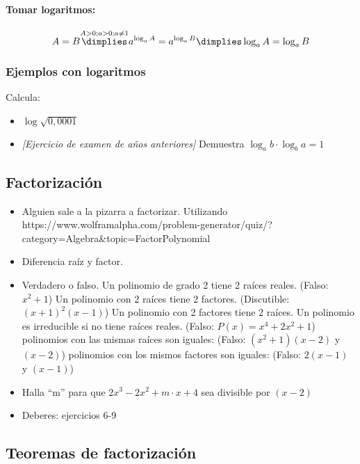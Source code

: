 \paragraph{Tomar logaritmos:}

\[
A = B \overset{A>0; a>0; a\neq 1}{\dimplies} a^{\log_a A} = a^{\log_a B} \dimplies \log_aA=\log_aB
\]


\subsubsection{Ejemplos con logaritmos}

Calcula:
\begin{itemize}
	\item $\log \sqrt{0,0001}$
	\item \textit{[Ejercicio de examen de años anteriores]} Demuestra $\log_a b · \log_b a = 1$ 
\end{itemize}


\subsection{Factorización}

\begin{itemize}
	\item Alguien sale a la pizarra a factorizar. Utilizando 
https://www.wolframalpha.com/problem-generator/quiz/?category=Algebra\&topic=FactorPolynomial 
	\item Diferencia raíz y factor.
	\item Verdadero o falso.
	\subitem Un polinomio de grado 2 tiene 2 raíces reales. (Falso: $x^2+1$)
	\subitem Un polinomio con 2 raíces tiene 2 factores. (Discutible: $(x+1)^2(x-1)$)
	\subitem Un polinomio con 2 factores tiene 2 raíces.
	\subitem Un polinomio es irreducible si no tiene raíces reales. (Falso: $P(x) = x^4+2x^2+1$)
	 polinomios con las mismas raíces son iguales: (Falso: $(x^2+1)(x-2)$ y $(x-2)$)
	 polinomios con los mismos factores son iguales: (Falso: $2(x-1)$ y $(x-1)$)

	\item Halla “m” para que $2x^3-2x^2+m·x+4$ sea divisible por $(x-2)$

	\item Deberes: ejercicios 6-9
\end{itemize}


\subsection{Teoremas de factorización}

